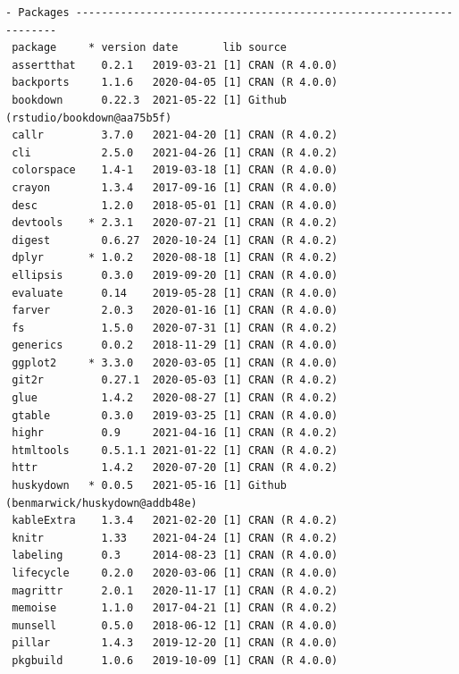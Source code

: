 \documentclass [11pt, proquest] {uwthesis}[2015/03/03]
\begin{document}
\begin{verbatim}
- Packages -------------------------------------------------------------------
 package     * version date       lib source                               
 assertthat    0.2.1   2019-03-21 [1] CRAN (R 4.0.0)                       
 backports     1.1.6   2020-04-05 [1] CRAN (R 4.0.0)                       
 bookdown      0.22.3  2021-05-22 [1] Github (rstudio/bookdown@aa75b5f)    
 callr         3.7.0   2021-04-20 [1] CRAN (R 4.0.2)                       
 cli           2.5.0   2021-04-26 [1] CRAN (R 4.0.2)                       
 colorspace    1.4-1   2019-03-18 [1] CRAN (R 4.0.0)                       
 crayon        1.3.4   2017-09-16 [1] CRAN (R 4.0.0)                       
 desc          1.2.0   2018-05-01 [1] CRAN (R 4.0.0)                       
 devtools    * 2.3.1   2020-07-21 [1] CRAN (R 4.0.2)                       
 digest        0.6.27  2020-10-24 [1] CRAN (R 4.0.2)                       
 dplyr       * 1.0.2   2020-08-18 [1] CRAN (R 4.0.2)                       
 ellipsis      0.3.0   2019-09-20 [1] CRAN (R 4.0.0)                       
 evaluate      0.14    2019-05-28 [1] CRAN (R 4.0.0)                       
 farver        2.0.3   2020-01-16 [1] CRAN (R 4.0.0)                       
 fs            1.5.0   2020-07-31 [1] CRAN (R 4.0.2)                       
 generics      0.0.2   2018-11-29 [1] CRAN (R 4.0.0)                       
 ggplot2     * 3.3.0   2020-03-05 [1] CRAN (R 4.0.0)                       
 git2r         0.27.1  2020-05-03 [1] CRAN (R 4.0.2)                       
 glue          1.4.2   2020-08-27 [1] CRAN (R 4.0.2)                       
 gtable        0.3.0   2019-03-25 [1] CRAN (R 4.0.0)                       
 highr         0.9     2021-04-16 [1] CRAN (R 4.0.2)                       
 htmltools     0.5.1.1 2021-01-22 [1] CRAN (R 4.0.2)                       
 httr          1.4.2   2020-07-20 [1] CRAN (R 4.0.2)                       
 huskydown   * 0.0.5   2021-05-16 [1] Github (benmarwick/huskydown@addb48e)
 kableExtra    1.3.4   2021-02-20 [1] CRAN (R 4.0.2)                       
 knitr         1.33    2021-04-24 [1] CRAN (R 4.0.2)                       
 labeling      0.3     2014-08-23 [1] CRAN (R 4.0.0)                       
 lifecycle     0.2.0   2020-03-06 [1] CRAN (R 4.0.0)                       
 magrittr      2.0.1   2020-11-17 [1] CRAN (R 4.0.2)                       
 memoise       1.1.0   2017-04-21 [1] CRAN (R 4.0.2)                       
 munsell       0.5.0   2018-06-12 [1] CRAN (R 4.0.0)                       
 pillar        1.4.3   2019-12-20 [1] CRAN (R 4.0.0)                       
 pkgbuild      1.0.6   2019-10-09 [1] CRAN (R 4.0.0)                       

\end{verbatim}
\end{document}
